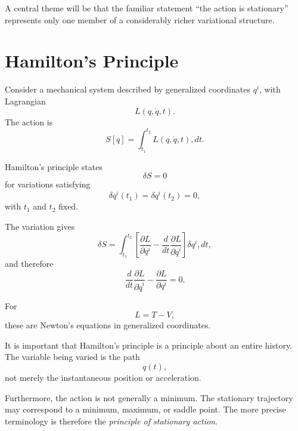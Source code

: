 A central theme will be that the familiar statement ``the action is stationary'' represents only one member of a considerably richer variational structure.

\section{Hamilton's Principle}

Consider a mechanical system described by generalized coordinates
$q^i$, with Lagrangian
\begin{equation}
L(q,\dot q,t).
\end{equation}
The action is
\begin{equation}
S[q]
=
\int_{t_1}^{t_2}
L(q,\dot q,t),dt.
\end{equation}

Hamilton's principle states
\begin{equation}
\boxed{\delta S=0}
\label{eq:hamilton-principle}
\end{equation}
for variations satisfying
\begin{equation}
\delta q^i(t_1)=\delta q^i(t_2)=0,
\end{equation}
with $t_1$ and $t_2$ fixed.

The variation gives
\begin{equation}
\delta S=\int_{t_1}^{t_2}\left[\frac{\partial L}{\partial q^i}
-\frac{d}{dt}\frac{\partial L}{\partial\dot q^i}\right]\delta q^i,dt,
\end{equation}
and therefore
\begin{equation}
\boxed{
\frac{d}{dt}
\frac{\partial L}{\partial\dot q^i}
-
\frac{\partial L}{\partial q^i}
=0.
}
\end{equation}

For
\begin{equation}
L=T-V,
\end{equation}
these are Newton's equations in generalized coordinates.

It is important that Hamilton's principle is a principle about an entire history.  The variable being varied is the path
\begin{equation}
q(t),
\end{equation}
not merely the instantaneous position or acceleration.

Furthermore, the action is not generally a minimum.  The stationary trajectory may correspond to a minimum, maximum, or saddle point.  The more precise terminology is therefore the \emph{principle of stationary action}.

